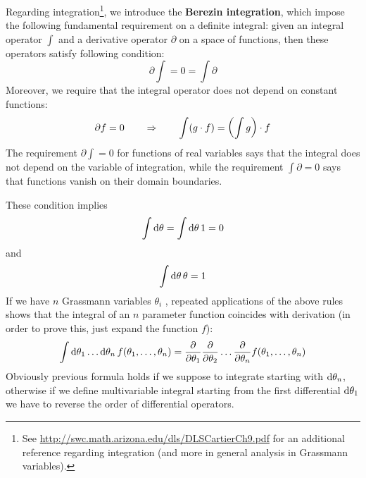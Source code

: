 \documentclass[../main/main.tex]{subfiles}
\begin{document}
Regarding integration\footnote{See \url{http://swc.math.arizona.edu/dls/DLSCartierCh9.pdf} for an additional reference regarding integration (and more in general analysis in Grassmann variables).}, we introduce the \textbf{Berezin integration}, which impose the following fundamental requirement on a definite integral: given an integral operator $\int$ and a derivative operator $\partial$ on a space of functions, then these operators satisfy following condition:
\[\partial\int=0=\int\partial\]
Moreover, we require that the integral operator does not depend on constant functions:
\[\partial f=0\qquad\Rightarrow\qquad\int(g\cdot f)=\left(\int g\right)\cdot f\]
The requirement $\partial \int =0$ for functions of real variables says that the integral does not depend on the variable of integration, while the requirement $\int\partial=0$ says that functions vanish on their domain boundaries. 

These condition implies 
\[\int\textup{d}\theta=\int\textup{d}\theta\,1=0\]
and 
\[\int\textup{d}\theta\,\theta=1\]
If we have $n$ Grassmann variables $\theta_i$ , repeated applications of the above rules shows that the integral of an $n$ parameter function coincides with derivation (in order to prove this, just expand the function $f$):
\[\int\textup{d}\theta_1\dots\textup{d}\theta_n\,f(\theta_1,\dots,\theta_n)=\frac{\partial}{\partial\theta_1}\frac{\partial}{\partial\theta_2}\dots\frac{\partial}{\partial\theta_n}f(\theta_1,\dots,\theta_n)\]
Obviously previous formula holds if we suppose to integrate starting with $\textup{d}\theta_n$, otherwise if we define multivariable integral starting from the first differential $\textup{d} \theta_1$ we have to reverse the order of differential operators. 
\end{document}
